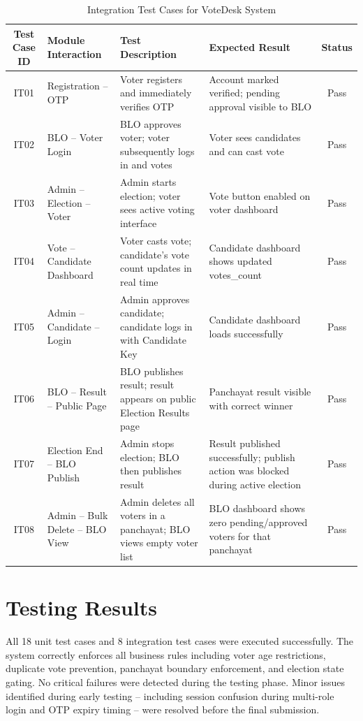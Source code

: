 \begin{table}[H]
\centering
\renewcommand{\arraystretch}{1.3}
\small
\begin{tabular}{|c|p{3cm}|p{3.5cm}|p{3.5cm}|c|}
\hline
\textbf{Test Case ID} & \textbf{Module Interaction} & \textbf{Test Description} & \textbf{Expected Result} & \textbf{Status} \\
\hline
IT01 & Registration -- OTP & Voter registers and immediately verifies OTP & Account marked verified; pending approval visible to BLO & Pass \\
\hline
IT02 & BLO -- Voter Login & BLO approves voter; voter subsequently logs in and votes & Voter sees candidates and can cast vote & Pass \\
\hline
IT03 & Admin -- Election -- Voter & Admin starts election; voter sees active voting interface & Vote button enabled on voter dashboard & Pass \\
\hline
IT04 & Vote -- Candidate Dashboard & Voter casts vote; candidate's vote count updates in real time & Candidate dashboard shows updated votes\_count & Pass \\
\hline
IT05 & Admin -- Candidate -- Login & Admin approves candidate; candidate logs in with Candidate Key & Candidate dashboard loads successfully & Pass \\
\hline
IT06 & BLO -- Result -- Public Page & BLO publishes result; result appears on public Election Results page & Panchayat result visible with correct winner & Pass \\
\hline
IT07 & Election End -- BLO Publish & Admin stops election; BLO then publishes result & Result published successfully; publish action was blocked during active election & Pass \\
\hline
IT08 & Admin -- Bulk Delete -- BLO View & Admin deletes all voters in a panchayat; BLO views empty voter list & BLO dashboard shows zero pending/approved voters for that panchayat & Pass \\
\hline
\end{tabular}
\caption{Integration Test Cases for VoteDesk System}
\label{tab:integration_tests}
\end{table}

\section{Testing Results}

All 18 unit test cases and 8 integration test cases were executed successfully. The system correctly enforces all business rules including voter age restrictions, duplicate vote prevention, panchayat boundary enforcement, and election state gating. No critical failures were detected during the testing phase. Minor issues identified during early testing -- including session confusion during multi-role login and OTP expiry timing -- were resolved before the final submission.
